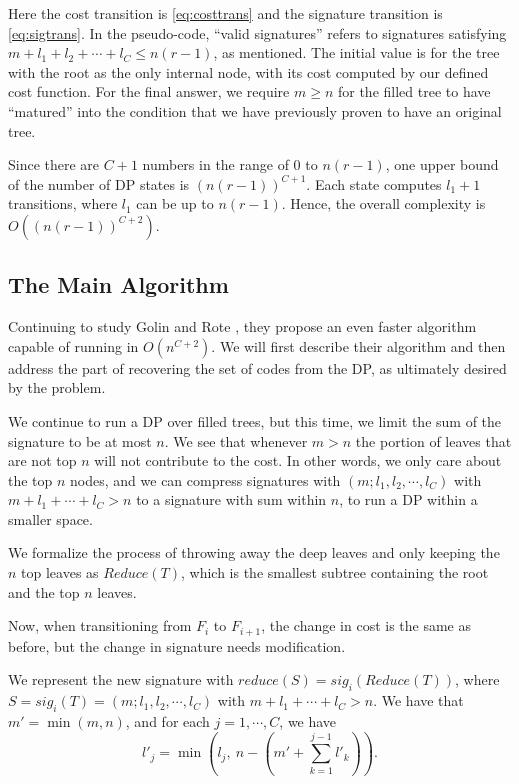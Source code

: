 \documentclass[a4paper,10pt,english]{scrartcl}
\begin{document}
Here the cost transition is \eqref{eq:costtrans} and the signature transition is \eqref{eq:sigtrans}. In the pseudo-code, ``valid signatures'' refers to signatures satisfying $m + l_1 + l_2+\cdots +l_C \le n(r-1)$, as mentioned. The initial value is for the tree with the root as the only internal node, with its cost computed by our defined cost function. For the final answer, we require $m \ge n$ for the filled tree to have ``matured'' into the condition that we have previously proven to have an original tree. 

Since there are $C+1$ numbers in the range of $0$ to $n(r-1)$, one upper bound of the number of DP states is $(n(r-1))^{C+1}$. Each state computes $l_1+1$ transitions, where $l_1$ can be up to $n(r-1)$. Hence, the overall complexity is $O((n(r-1))^{C+2})$.

\subsection{The Main Algorithm}\label{sec:main}

Continuing to study Golin and Rote \cite{GolinRote1998}, they propose an even faster algorithm capable of running in $O(n^{C+2})$. We will first describe their algorithm and then address the part of recovering the set of codes from the DP, as ultimately desired by the problem. 

We continue to run a DP over filled trees, but this time, we limit the sum of the signature to be at most $n$. We see that whenever $m > n$ the portion of leaves that are not top $n$ will not contribute to the cost. In other words, we only care about the top $n$ nodes, and we can compress signatures with $(m; l_1, l_2, \cdots, l_C)$ with $m+l_1+\cdots+l_C>n$ to a signature with sum within $n$, to run a DP within a smaller space. 

We formalize the process of throwing away the deep leaves and only keeping the $n$ top leaves as $Reduce(T)$, which is the smallest subtree containing the root and the top $n$ leaves. 

Now, when transitioning from $F_i$ to $F_{i+1}$, the change in cost is the same as before, but the change in signature needs modification. 

We represent the new signature with $reduce(S) = sig_i(Reduce(T))$, where $S = sig_i(T) = (m; l_1, l_2, \cdots, l_C)$ with $m+l_1+\cdots+l_C>n$. We have that $m' = \min(m,n)$, and for each $j = 1, \cdots, C$, we have 
\begin{equation}\label{eq:reduce}
l'_j = \min\left(l_j,\ n-\left(m'+\sum_{k=1}^{j-1} l'_k\right)\right).
\end{equation}
\end{document}
